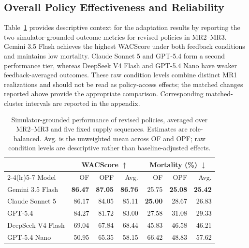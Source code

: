 \documentclass[letterpaper]{article} %
\begin{document}
\subsection{Overall Policy Effectiveness and Reliability}

Table~\ref{tab:outcome-performance} provides descriptive context for the
adaptation results by reporting the two simulator-grounded outcome metrics
for revised policies in MR2--MR3. Gemini 3.5 Flash achieves the highest
WACScore under both feedback conditions and maintains low mortality. Claude
Sonnet 5 and GPT-5.4 form a second performance tier, whereas DeepSeek V4
Flash and GPT-5.4 Nano have weaker feedback-averaged outcomes. These raw
condition levels combine distinct MR1 realizations and should not be read as
policy-access effects; the matched changes reported above provide the
appropriate comparison. Corresponding matched-cluster intervals are reported
in the appendix.

\begin{table}[t]
    \centering
    \small
    \setlength{\tabcolsep}{5pt}
    \caption{Simulator-grounded performance of revised policies, averaged
    over MR2--MR3 and five fixed supply sequences. Estimates are
    role-balanced. Avg. is the unweighted mean across OF and OPF; raw
    condition levels are descriptive rather than baseline-adjusted effects.}
    \label{tab:outcome-performance}
    \begin{tabular}{lrrr rrr}
        \toprule
        & \multicolumn{3}{c}{WACScore $\uparrow$}
        & \multicolumn{3}{c}{Mortality (\%) $\downarrow$} \\
        \cmidrule(lr){2-4}\cmidrule(lr){5-7}
        Model & OF & OPF & Avg. & OF & OPF & Avg. \\
        \midrule
        Gemini 3.5 Flash  & \textbf{86.47} & \textbf{87.05} & \textbf{86.76} & 25.75 & \textbf{25.08} & \textbf{25.42} \\
        Claude Sonnet 5   & 86.17 & 84.05 & 85.11 & \textbf{25.00} & 28.67 & 26.83 \\
        GPT-5.4           & 84.27 & 81.72 & 83.00 & 27.58 & 31.08 & 29.33 \\
        DeepSeek V4 Flash & 69.04 & 67.84 & 68.44 & 45.83 & 46.58 & 46.21 \\
        GPT-5.4 Nano      & 50.95 & 65.35 & 58.15 & 66.42 & 48.83 & 57.62 \\
        \bottomrule
    \end{tabular}
\end{table}
\end{document}

